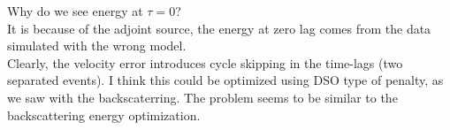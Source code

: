 \begin{frame}\end{frame}
\begin{frame}\end{frame}
\begin{frame}\end{frame}
\begin{frame}\end{frame}
\begin{frame}\end{frame}

\begin{frame}
Why do we see energy at $\tau=0$?\\
It is because of the adjoint source, the energy 
at zero lag comes from the data simulated with the wrong model.\\
Clearly, the velocity error introduces cycle skipping in the time-lags (two separated events). 
I think this could be optimized using DSO type of penalty, as we saw with the backscaterring. 
The problem seems to be similar to the backscattering energy optimization.
\end{frame}






